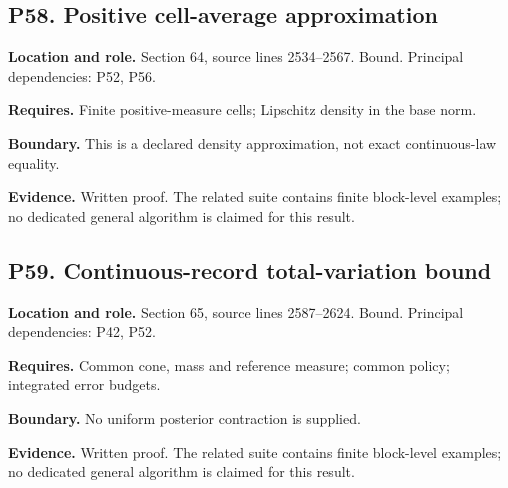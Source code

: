 \documentclass[11pt,oneside,openany]{book}
\numberwithin{equation}{section}
\begin{document}
\par\noindent\begin{minipage}{\textwidth}
\subsection{P58. Positive cell-average
approximation}\label{LSMRegister:p58.-positive-cell-average-approximation}

\textbf{Location and role.} Section 64, source lines 2534--2567. Bound.
Principal dependencies: P52, P56.

\textbf{Requires.} Finite positive-measure cells; Lipschitz density in
the base norm.

\textbf{Boundary.} This is a declared density approximation, not exact
continuous-law equality.

\textbf{Evidence.} Written proof. The related suite contains finite
block-level examples; no dedicated general algorithm is claimed for this
result.
\end{minipage}\par\medskip

\par\noindent\begin{minipage}{\textwidth}
\subsection{P59. Continuous-record total-variation
bound}\label{LSMRegister:p59.-continuous-record-total-variation-bound}

\textbf{Location and role.} Section 65, source lines 2587--2624. Bound.
Principal dependencies: P42, P52.

\textbf{Requires.} Common cone, mass and reference measure; common
policy; integrated error budgets.

\textbf{Boundary.} No uniform posterior contraction is supplied.

\textbf{Evidence.} Written proof. The related suite contains finite
block-level examples; no dedicated general algorithm is claimed for this
result.
\end{minipage}\par\medskip
\end{document}
